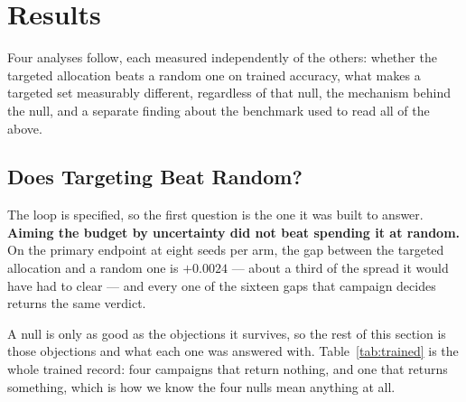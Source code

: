 \documentclass{article}
\begin{document}
\section{Results}
\label{sec:results}
Four analyses follow, each measured independently of the others: whether the targeted allocation
beats a random one on trained accuracy, what makes a targeted set measurably different, regardless of
that null, the mechanism behind the null, and a separate finding about the benchmark used to read all
of the above.

\subsection{Does Targeting Beat Random?}
\label{sec:null}
The loop is specified, so the first question is the one it was built to answer. \textbf{Aiming the budget by uncertainty did not beat spending it at random.} On the primary endpoint at eight seeds
per arm, the gap between the targeted allocation and a random one is $+0.0024$ --- about a third of
the spread it would have had to clear --- and every one of the sixteen gaps that campaign decides
returns the same verdict.

A null is only as good as the objections it survives, so the rest of this section is those
objections and what each one was answered with. Table~\ref{tab:trained} is the whole trained record: four campaigns that return nothing, and one that returns something, which is how we know the four
nulls mean anything at all.
\end{document}
